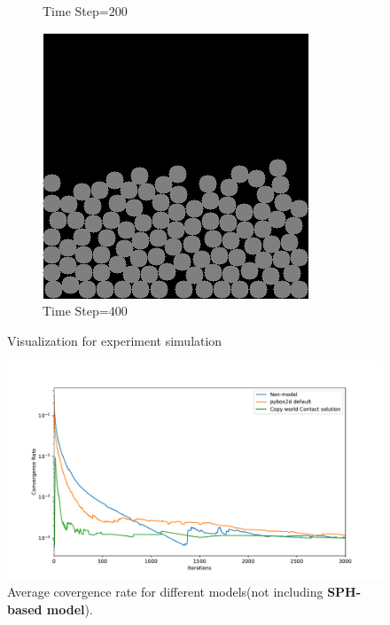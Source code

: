 \begin{figure}[!h]
\begin{subfigure}[b]{0.3\textwidth}
            \caption{Time Step=$200$}
        \end{subfigure}
        \begin{subfigure}[b]{0.3\textwidth}
            \includegraphics[width=\textwidth]{Figures/sim3.png}
            \caption{Time Step=$400$}
        \end{subfigure}
        \caption{Visualization for experiment simulation}
        \label{fig:simvi}
    \end{figure}
    \begin{figure}[!h]
        \centering
        \includegraphics[width=\textwidth]{Figures/nosph}
        \caption{Average covergence rate for different models(not including \textbf{SPH-based model}).}
        \label{fg:nosph}
    \end{figure}
